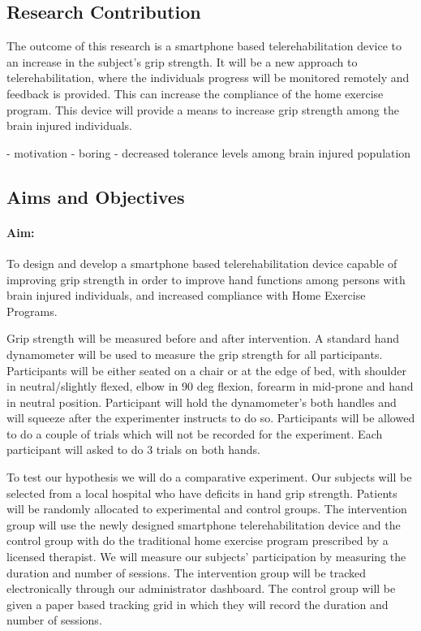 \documentclass[12pt]{article}
\begin{document}
 \subsection{Research Contribution}
 The outcome of this research is a smartphone based telerehabilitation device to  an increase in the subject's grip strength. It will be a new approach to telerehabilitation, where the individuals progress will be monitored remotely and feedback is provided. This can increase the compliance of the home exercise program. This device will provide a means to increase  grip strength among the brain injured individuals.
 
  - motivation
  - boring
  - decreased tolerance levels among brain injured population
\subsection {Aims and Objectives}
 \paragraph{Aim:}
 To design and develop a smartphone based telerehabilitation device capable of improving grip strength in order to improve hand functions among persons with brain injured individuals, and  increased compliance with Home Exercise Programs.
 
  Grip strength will be measured before and after intervention. A standard hand dynamometer will be used to measure the grip strength for all participants. Participants will be either seated on a chair or at the edge of bed, with shoulder in neutral/slightly flexed, elbow in 90 deg flexion, forearm in mid-prone and hand in neutral position. Participant will hold the dynamometer's both handles and will squeeze after the experimenter instructs to do so.  Participants will be allowed to do a couple of trials which will not be recorded for the experiment. Each participant will asked to do 3 trials on both hands.
 
 To test our hypothesis we will do a comparative experiment. Our subjects will be selected from a local hospital who have deficits in hand grip strength. Patients will be randomly allocated to experimental and control groups. The intervention group will use the newly designed smartphone telerehabilitation device and the control group with do the traditional home exercise program prescribed by a licensed therapist. We will measure our subjects' participation by measuring the duration and number of sessions. The intervention group will be tracked electronically through our administrator dashboard. The control group will be given a paper based tracking grid in which they will record the duration and number of sessions. 
 
\end{document}
